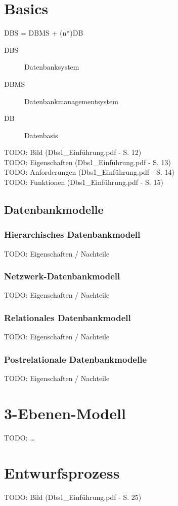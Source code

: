\section{Basics}
DBS = DBMS + (n*)DB
\begin{description}
\item[DBS] Datenbanksystem
\item[DBMS] Datenbankmanagementsystem
\item[DB] Datenbasis
\end{description}
TODO: Bild (Dbs1\_Einführung.pdf - S. 12) \\
TODO: Eigenschaften (Dbs1\_Einführung.pdf - S. 13) \\
TODO: Anforderungen (Dbs1\_Einführung.pdf - S. 14) \\
TODO: Funktionen (Dbs1\_Einführung.pdf - S. 15) \\

\subsection{Datenbankmodelle}
\subsubsection{Hierarchisches Datenbankmodell}
TODO: Eigenschaften / Nachteile \\
\subsubsection{Netzwerk-Datenbankmodell}
TODO: Eigenschaften / Nachteile \\
\subsubsection{Relationales Datenbankmodell}
TODO: Eigenschaften / Nachteile \\
\subsubsection{Postrelationale Datenbankmodelle}
TODO: Eigenschaften / Nachteile \\
\section{3-Ebenen-Modell}
TODO: \ldots \\
\section{Entwurfsprozess}
TODO: Bild (Dbs1\_Einführung.pdf - S. 25) \\